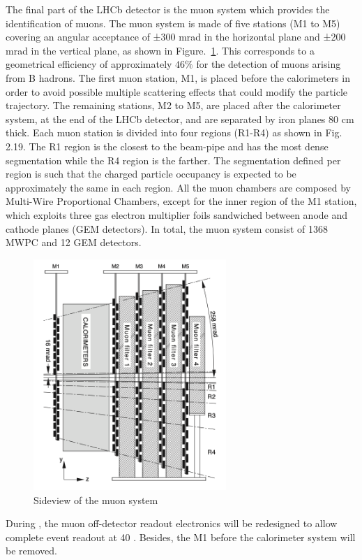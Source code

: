 The final part of the LHCb detector is the muon system which provides the identification
of muons. 
The muon system is made of five stations (M1 to M5) covering an angular acceptance of ±300 mrad in the horizontal plane and ±200 mrad in the vertical plane,
as shown in Figure.~\ref{fig:MUON}.
This corresponds to a geometrical efficiency of approximately $46\%$ for the detection
of muons arising from B hadrons. 
The first muon station, M1, 
is placed before the calorimeters in order to avoid possible multiple scattering effects that could modify the
particle trajectory. 
The remaining stations, M2 to M5, 
are placed after the calorimeter system, 
at the end of the LHCb detector, 
and are separated by iron planes 80 cm thick.
Each muon station is divided into four regions (R1-R4) as shown in Fig. 2.19. 
The R1
region is the closest to the beam-pipe and has the most dense segmentation while the R4 region is the farther. 
The segmentation defined per region is such that the charged particle occupancy is expected to be approximately the same in each region. 
All the muon chambers are composed by Multi-Wire Proportional Chambers, 
except for the inner region of the M1 station, 
which exploits three gas electron multiplier foils sandwiched between anode and cathode planes (GEM detectors). 
In total, the muon system consist of 1368 MWPC and 12 GEM detectors.

\begin{figure}[!hbtp]
\centering
\includegraphics[width=0.65\textwidth]{Figures/02_Detector/MUON}%
\caption{ Sideview of the muon system\supercite{LHCb-DP-2008-001}}
\label{fig:MUON}
\end{figure}

During \upgradeone,
the muon off-detector readout electronics will be redesigned to allow complete event readout at 40 \mhz.
Besides, the M1 before the calorimeter system will be removed\supercite{LHCb-TDR-015,Cardini_2014}.


